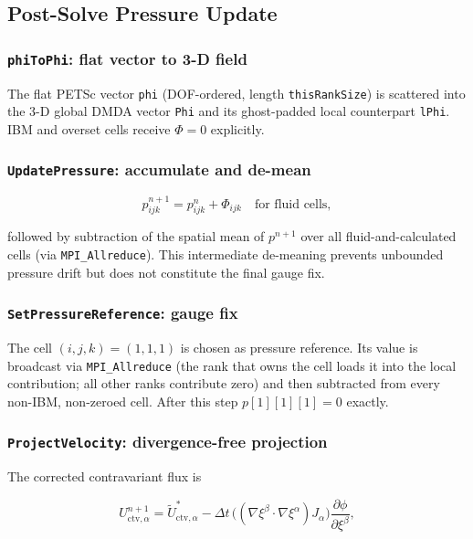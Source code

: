 \documentclass[12pt,a4paper]{article}
\begin{document}
\subsection{Post-Solve Pressure Update}
\label{sec:peqn-pupdate}

\subsubsection{\texttt{phiToPhi}: flat vector to 3-D field}

The flat PETSc vector \texttt{phi} (DOF-ordered, length
\texttt{thisRankSize}) is scattered into the 3-D global DMDA vector
\texttt{Phi} and its ghost-padded local counterpart \texttt{lPhi}.
IBM and overset cells receive $\Phi = 0$ explicitly.

\subsubsection{\texttt{UpdatePressure}: accumulate and de-mean}

\begin{equation}
  p^{n+1}_{ijk} = p^n_{ijk} + \Phi_{ijk}
  \quad \text{for fluid cells},
\end{equation}

followed by subtraction of the spatial mean of $p^{n+1}$ over all
fluid-and-calculated cells (via \texttt{MPI\_Allreduce}).  This
intermediate de-meaning prevents unbounded pressure drift but does not
constitute the final gauge fix.

\subsubsection{\texttt{SetPressureReference}: gauge fix}

The cell $(i,j,k)=(1,1,1)$ is chosen as pressure reference.  Its
value is broadcast via \texttt{MPI\_Allreduce} (the rank that owns
the cell loads it into the local contribution; all other ranks
contribute zero) and then subtracted from every non-IBM,
non-zeroed cell.  After this step $p[1][1][1]=0$ exactly.

\subsubsection{\texttt{ProjectVelocity}: divergence-free projection}

The corrected contravariant flux is

\begin{equation}
  U^{n+1}_{\text{ctv},\alpha} =
  \widetilde{U}^*_{\text{ctv},\alpha}
  - \Delta t\,
    \bigl((\nabla\xi^\beta\cdot\nabla\xi^\alpha)J_\alpha\bigr)
    \frac{\partial\phi}{\partial\xi^\beta},
\end{equation}
\end{document}
